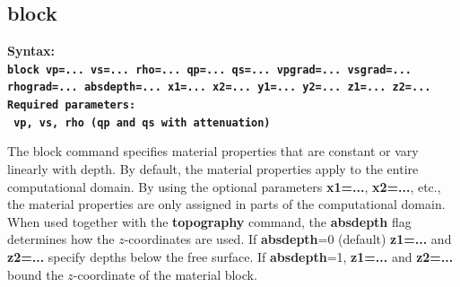 \documentclass[11pt]{report}
\begin{document}
\subsection{block}
\label{keyword:block}
\begin{flushleft}\bf
Syntax:\\
\tt block
vp=... vs=... rho=... qp=... qs=... vpgrad=... vsgrad=... rhograd=... absdepth=... x1=... x2=... y1=... y2=... z1=... z2=...\\
\bf
Required parameters:\\
\tt
vp, vs, rho  (qp and qs with attenuation)
\end{flushleft}
%
The block command specifies material properties that are constant or vary linearly with depth. By
default, the material properties apply to the entire computational domain. By using the optional
parameters {\bf x1=...}, {\bf x2=...}, etc., the material properties are only assigned in parts of
the computational domain. When used together with the {\bf topography} command, the {\bf absdepth}
flag determines how the $z$-coordinates are used. If {\bf absdepth}=0 (default) {\bf z1=...} and
{\bf z2=...} specify depths below the free surface. If {\bf absdepth}=1,  {\bf z1=...} and
{\bf z2=...} bound the $z$-coordinate of the material block.
\end{document}
